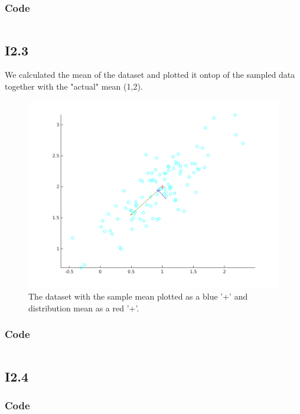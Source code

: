 \documentclass{article}
\begin{document}
\subsubsection{Code}

\inputminted{matlab}{part1/i22john.m}

\subsection{I2.3}


We calculated the mean of the dataset and plotted it ontop of the sampled
data together with the "actual" mean (1,2).

\begin{figure}[!ht]
    \centering
    \includegraphics[width=\textwidth]{part1/I231.png}
    \caption{The dataset with the sample mean plotted as a blue '+' and
    distribution mean as a red '+'.}
    \label{fig:I3.1}
\end{figure}

\subsubsection{Code}

\inputminted{matlab}{part1/i23john.m}

\subsection{I2.4}



\subsubsection{Code}
\end{document}
